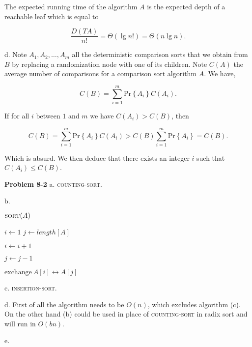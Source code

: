 \documentclass[a4paper,12pt]{article}
\newcommand{\newprob}[1]
{\bigskip \noindent \textbf{Problem #1} \newline}
\newcommand{\subpar}[1]{\medskip \noindent #1.}
\newcommand{\la}{\leftarrow}
\newcommand{\exchange}[2]{\mathrm{exchange}\ #1 \leftrightarrow #2}
\newcommand{\prob}[1]{\mathrm{Pr}\left\{ #1 \right\}}
\newenvironment{alg}[2]
               {\noindent $\textsc{#1}(#2)$ \begin{algorithmic}}
               {\end{algorithmic}}
\begin{document}
The expected running time of the algorithm $A$ is the expected depth
of a reachable leaf which is equal to

\[ \frac{D(TA)}{n!} = \Theta(\lg n!) = \Theta(n\lg n).\]

\subpar{d} Note $A_1, A_2, \ldots, A_m$ all the deterministic
comparison sorts that we obtain from $B$ by replacing a randomization
node with one of its children.  Note $C(A)$ the average number of
comparisons for a comparison sort algorithm $A$.  We have,

\[ C(B) = \sum_{i=1}^m \prob{A_i} C(A_i).\]

If for all $i$ between $1$ and $m$ we have $C(A_i) > C(B)$, then

\[ C(B) = \sum_{i=1}^m \prob{A_i} C(A_i) > C(B) \sum_{i=1}^m
\prob{A_i} = C(B).\]

Which is absurd.  We then deduce that there exists an integer $i$ such
that $C(A_i) \le C(B)$.

\newprob{8-2} \subpar{a} \textsc{counting-sort}.

\subpar{b}

\begin{alg}{sort}{A}
  \STATE $i \la 1$
  \STATE $j \la length[A]$


  \STATE $i \la i + 1$
  \ENDWHILE

  \STATE $j \la j - 1$
  \ENDWHILE

  \STATE $\exchange{A[i]}{A[j]}$
  \ENDWHILE
\end{alg}

\subpar{c} \textsc{insertion-sort}.

\subpar{d} First of all the algorithm needs to be $O(n)$, which excludes
algorithm (c).  On the other hand (b) could be used in place of
\textsc{counting-sort} in radix sort and will run in $O(bn)$.

\subpar{e}
\end{document}
